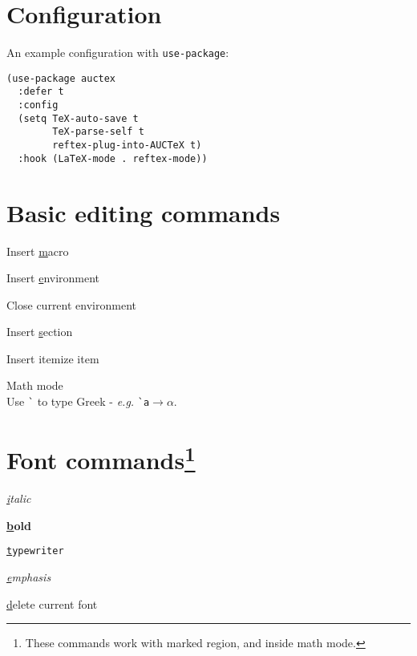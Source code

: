 \documentclass[landscape]{article}
\newcommand{\kbd}[1]{\colorbox{gray!10!}{\texttt{#1}}}
\newcommand{\doctitle}{\texttt{AUC}\TeX \hspace{.25em} Cheatsheet}
\newcommand{\element}[2][-]{\item[#1] \parbox[t]{\linewidth}{#2}}
\begin{document}
\hspace*{\fill}{\huge \bfseries \doctitle \hspace*{\fill}}
\vspace{2em}
  
\begin{multicols}{3}

\section*{Configuration}

An example configuration with \texttt{use-package}:
  
\begin{Verbatim}
(use-package auctex
  :defer t
  :config
  (setq TeX-auto-save t
        TeX-parse-self t
        reftex-plug-into-AUCTeX t)
  :hook (LaTeX-mode . reftex-mode))
\end{Verbatim}

\section*{Basic editing commands}

\begin{description}[align=left,labelwidth=1.5cm]
\element[\kbd{C-c C-m}]{ Insert \underline{m}acro }
\element[\kbd{C-c C-e}]{ Insert \underline{e}nvironment }
\element[\kbd{C-c ]}]{   Close current environment } 
\element[\kbd{C-c C-s}]{ Insert \underline{s}ection }
\element[\kbd{C-c C-j}]{ Insert itemize item }
\element[\kbd{C-c \~}] { Math mode\\ 
  Use \texttt{\`} to type Greek - \textit{e.g.} \texttt{\`}\texttt{a}$\rightarrow\alpha$. }
\end{description}


\section*{Font commands\footnote{ These commands work with marked region, and inside math mode.}}
\label{sec:font-commands}

\begin{description}[align=left,labelwidth=1.5cm]
\element[\kbd{C-c C-f C-i}]{ \textit{\underline{i}talic}}
\element[\kbd{C-c C-f C-b}]{ \textbf{\underline{b}old} }
\element[\kbd{C-c C-f C-t}]{ \texttt{\underline{t}ypewriter} }
\element[\kbd{C-c C-f C-t}]{ \emph{\underline{e}mphasis} }
\element[\kbd{C-c C-f C-d}]{ \underline{d}elete current font }
\end{description}


\end{multicols}
\end{document}
